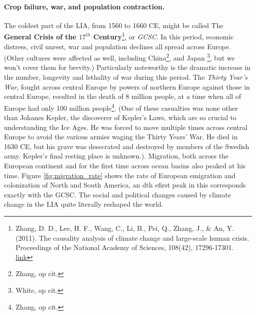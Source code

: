 \paragraph{Crop failure, war, and population contraction.}
The coldest part of the LIA, from 1560 to 1660 CE, might be called The \textbf{General Crisis of the $17^{th}$ Century}\footnote{Zhang, D. D., Lee, H. F., Wang, C., Li, B., Pei, Q., Zhang, J., \& An, Y. (2011). The causality analysis of climate change and large-scale human crisis. Proceedings of the National Academy of Sciences, 108(42), 17296-17301. \href{https://doi.org/10.1073/pnas.1104268108}{link}}, or \textit{GCSC}. In this period, economic distress, civil unrest, war and population declines all spread across Europe. (Other cultures were affected as well, including China\footnote{Zhang, op cit.}, and Japan \footnote{White, op cit.}, but we won't cover them for brevity.) Particularly noteworthy is the dramatic increase in the number, longevity and lethality of war during this period. The \textit{Thirty Year's War}, fought across central Europe by powers of northern Europe against those in central Europe, resulted in the death of 8 million people, at a time when all of Europe had only 100 million people\footnote{Zhang, op cit.}. (One of these casualties was none other than Johanes Kepler, the discoverer of Kepler's Laws, which are so crucial to understanding the Ice Ages. He was forced to move multiple times across central Europe to avoid the various armies waging the Thirty Years' War. He died in 1630 CE, but his grave was desecrated and destroyed by members of the Swedish army. Kepler's final resting place is unknown.). Migration, both across the European continent and for the first time across ocean basins also peaked at his time. Figure \ref{fig:migration_rate} shows the rate of European emigration and colonization of North and South America, an dth efirst peak in this corresponds exactly with the GCSC. The social and political changes caused by climate change in the LIA quite literally reshaped the world.\\

